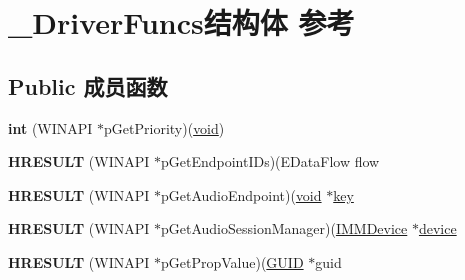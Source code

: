 \hypertarget{struct___driver_funcs}{}\section{\+\_\+\+Driver\+Funcs结构体 参考}
\label{struct___driver_funcs}
\subsection*{Public 成员函数}
\begin{DoxyCompactItemize}
\item 
\mbox{\label{struct___driver_funcs_a08964635e518803d49dfd4aa99a0ff19}} 
{\bfseries int} (W\+I\+N\+A\+PI $\ast$p\+Get\+Priority)(\hyperlink{interfacevoid}{void})
\item 
\mbox{\label{struct___driver_funcs_aa51d3c3655b837dc2fb10151fd9b6b7d}} 
{\bfseries H\+R\+E\+S\+U\+LT} (W\+I\+N\+A\+PI $\ast$p\+Get\+Endpoint\+I\+Ds)(E\+Data\+Flow flow
\item 
\mbox{\label{struct___driver_funcs_a408dc58c1a7ab17f4e56871621122cb6}} 
{\bfseries H\+R\+E\+S\+U\+LT} (W\+I\+N\+A\+PI $\ast$p\+Get\+Audio\+Endpoint)(\hyperlink{interfacevoid}{void} $\ast$\hyperlink{structkey}{key}
\item 
\mbox{\label{struct___driver_funcs_a84ff1def5087ddf25077da99cc5323a0}} 
{\bfseries H\+R\+E\+S\+U\+LT} (W\+I\+N\+A\+PI $\ast$p\+Get\+Audio\+Session\+Manager)(\hyperlink{interface_i_m_m_device}{I\+M\+M\+Device} $\ast$\hyperlink{structdevice}{device}
\item 
\mbox{\label{struct___driver_funcs_a3c035cdc2c3bf43a706282b12cb88204}} 
{\bfseries H\+R\+E\+S\+U\+LT} (W\+I\+N\+A\+PI $\ast$p\+Get\+Prop\+Value)(\hyperlink{interface_g_u_i_d}{G\+U\+ID} $\ast$guid
\end{DoxyCompactItemize}
